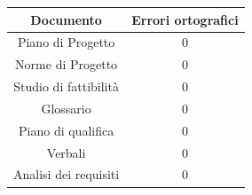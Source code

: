 \begin{center}
	\begin{longtable}{|c|c|}
	\hline
	\rowcolor{lighter-grayer}
	\textbf{Documento} & \textbf{Errori ortografici} \\
	\hline
	\endfirsthead

	\hline
	Piano di Progetto & 0 \\
	\hline
	\hline
	Norme di Progetto &  0 \\
	\hline
	\hline
	Studio di fattibilità & 0 \\
	\hline
	\hline
	Glossario & 0 \\
	\hline
	\hline
	Piano di qualifica & 0 \\
	\hline
	\hline
	Verbali & 0 \\
	\hline
	\hline
	Analisi dei requisiti & 0 \\
	\hline

	\end{longtable}
\end{center}